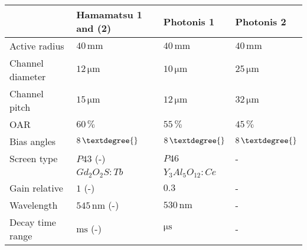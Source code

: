 \begin{table}[ht]
  \centering
  \caption[]{}
  \label{chap4:MCP_Phosphor}
  \begin{tabular}{llll}
    \toprule
                     & Hamamatsu 1 and (2)         & Photonis 1                  & Photonis 2                  \\
    \midrule
    Active radius    & $40\,\mathrm{mm}$           & $40\,\mathrm{mm}$           & $40\,\mathrm{mm}$           \\
    Channel diameter & $12\,\mathrm{\mu m}$        & $10\,\mathrm{\mu m}$        & $25\,\mathrm{\mu m}$        \\
    Channel pitch    & $15\,\mathrm{\mu m}$        & $12\,\mathrm{\mu m}$        & $32\,\mathrm{\mu m}$        \\
    OAR              & $60\,\mathrm{\%}$           & $55\,\mathrm{\%}$           & $45\,\mathrm{\%}$           \\
    Bias angles      & $8\,\mathrm{\textdegree{}}$ & $8\,\mathrm{\textdegree{}}$ & $8\,\mathrm{\textdegree{}}$ \\
    \midrule
    Screen type      & $P43$ (-)                   & $P46$                       & -                           \\
                     & $Gd_{2}O_{2}S:Tb$           & $Y_{3}Al_{5}O_{12}:Ce$      &                             \\
    Gain relative    & $1$ (-)                     & $0.3$                       & -                           \\
    Wavelength       & $545\,\mathrm{nm}$ (-)      & $530\,\mathrm{nm}$          & -                           \\
    Decay time range & $\mathrm{ms}$ (-)           & $\mathrm{\mu s}$            & -                           \\
    \bottomrule
  \end{tabular}
\end{table}